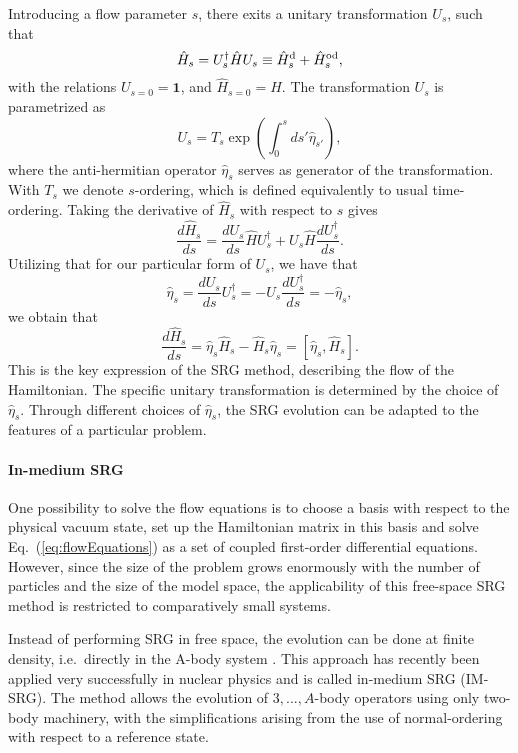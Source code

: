 \documentclass[aps,twocolumn,showpacs,floatfix,nofootinbib,preprintnumbers,superscriptaddress,amsmath,amssymb]{revtex4-1}
\newcommand{\Ho}{\hat{H}^{\rm od}}
\newcommand{\be}{\begin{equation}}
\newcommand{\ee}{\end{equation}}
\begin{document}
 Introducing a flow parameter $s$, there exits a unitary transformation $U_s$, such that
\begin{equation}
 \hat{H}_s = U_s^\dagger \hat{H} U_s \equiv \hat{H}^{\rm d}_s + \Ho_s,
\end{equation}
with the relations $U_{s=0} = \mathbf{1}$, and $\hat{H}_{s= 0} = \hat{H}$.
The transformation $U_s$ is parametrized as
\[
U_s = T_s \exp \left(\int_0^s \! ds'\hat{\eta}_{s'} \right),
\]
where the anti-hermitian operator $\hat{\eta}_s$ serves as generator of the transformation. With $T_s$ we denote $s$-ordering, which is defined equivalently to usual time-ordering.
Taking the derivative of $\hat{H}_s$ with respect to $s$ gives
\begin{equation}
 \frac{d \hat{H}_s}{ds} = \frac{d U_s}{ds}\hat{H} U_s^\dagger + U_s \hat{H} \frac{d U_s^\dagger}{ds}.
\label{eq:flow_long}
\end{equation}
Utilizing that for our particular form of $U_s$, we have that
\be 
\hat{\eta}_s = \frac{d U_s}{ds} U_s^\dagger = - U_s \frac{d U_s^\dagger}{ds} = -\hat{\eta}_s,
\label{eq:eta}
\ee
we obtain that
\be
\frac{d \hat{H}_s}{ds} = \hat{\eta}_s \hat{H}_s - \hat{H}_s \hat{\eta}_s = \left[\hat{\eta}_s, \hat{H}_s \right].
\label{eq:flowEquations}
\ee
This is the key expression of the SRG method, describing the flow of the Hamiltonian.
The specific unitary transformation is determined by the choice of $\hat{\eta}_s$. 
Through different choices of $\hat{\eta}_s$, the SRG evolution can be adapted to the features of a particular problem.\\

\paragraph*{In-medium SRG}

One possibility to solve the flow equations is to choose a basis with respect to the physical vacuum state, set up the  Hamiltonian matrix in this basis and solve Eq.~(\ref{eq:flowEquations}) as a set of coupled first-order differential equations. However, since the size of the problem grows enormously with the number of particles and the size of the model space, the applicability of this free-space SRG method is restricted to comparatively small systems. 

Instead of performing SRG in free space, the evolution can be done at finite density, i.e.~directly in the A-body system \cite{kehrein2006flow}. This approach has recently been applied very successfully in nuclear physics \cite{IMSRG,PhysRevLett.106.222502}
and is called in-medium SRG (IM-SRG). The method allows the evolution of 
 $3,...,A$-body operators using only two-body machinery, with the  simplifications arising from the use of normal-ordering with respect to a reference state.
\end{document}
